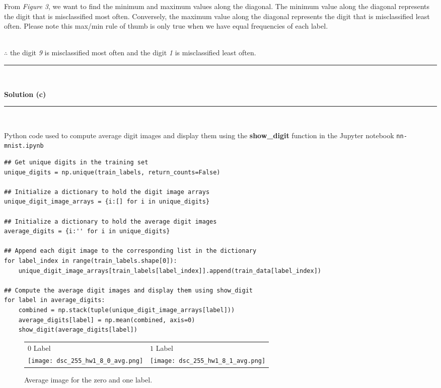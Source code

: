 \documentclass{article}
\begin{document}
\parbox{\textwidth}{From \textit{Figure 3}, we want to find the minimum and maximum values along the diagonal. The minimum value along the diagonal represents the digit that is misclassified most often. Conversely, the maximum value along the diagonal represents the digit that is misclassified least often. Please note this max/min rule of thumb is only true when we have equal frequencies of each label.}\\

$\therefore$ the digit \textit{9} is misclassified most often and the digit \textit{1} is misclassified least often.\\
\noindent\rule{\textwidth}{0.4pt}\\
\newpage

\textbf{Solution (c)}

\noindent\rule{\textwidth}{0.4pt}\\

\parbox{\textwidth}{Python code used to compute average digit images and display them using the \textbf{show\_digit} function in the Jupyter notebook \texttt{nn-mnist.ipynb} }

\begin{center}

\begin{lstlisting}
## Get unique digits in the training set
unique_digits = np.unique(train_labels, return_counts=False)

## Initialize a dictionary to hold the digit image arrays
unique_digit_image_arrays = {i:[] for i in unique_digits}

## Initialize a dictionary to hold the average digit images
average_digits = {i:'' for i in unique_digits}

## Append each digit image to the corresponding list in the dictionary
for label_index in range(train_labels.shape[0]):
    unique_digit_image_arrays[train_labels[label_index]].append(train_data[label_index])

## Compute the average digit images and display them using show_digit
for label in average_digits:
    combined = np.stack(tuple(unique_digit_image_arrays[label]))
    average_digits[label] = np.mean(combined, axis=0)
    show_digit(average_digits[label])

\end{lstlisting}
\end{center}

\begin{figure}[htbp]
\centering
\begin{tabular}{>{\centering\arraybackslash}p{} >{\centering\arraybackslash}p{}}
$0$ Label & $1$ Label \\
\texttt{[image: dsc\_255\_hw1\_8\_0\_avg.png]} & \texttt{[image: dsc\_255\_hw1\_8\_1\_avg.png]} \\
\end{tabular}
\caption{Average image for the zero and one label.}
\label{fig:image_comparison}
\end{figure}
\end{document}
